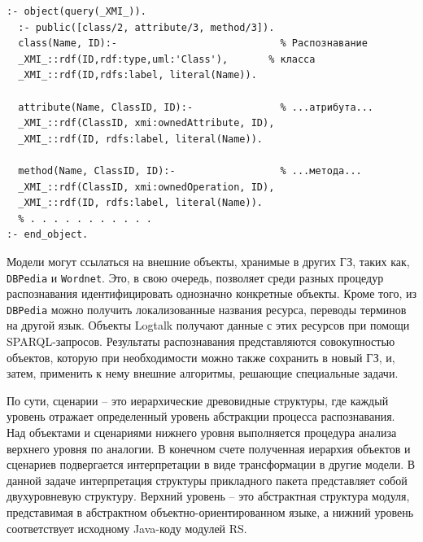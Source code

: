 \documentclass[12pt]{article}
\begin{document}
\begin{verbatim}
:- object(query(_XMI_)).
  :- public([class/2, attribute/3, method/3]).
  class(Name, ID):-                            % Распознавание
  _XMI_::rdf(ID,rdf:type,uml:'Class'),       % класса
  _XMI_::rdf(ID,rdfs:label, literal(Name)).

  attribute(Name, ClassID, ID):-               % ...атрибута...
  _XMI_::rdf(ClassID, xmi:ownedAttribute, ID),
  _XMI_::rdf(ID, rdfs:label, literal(Name)).

  method(Name, ClassID, ID):-                  % ...метода...
  _XMI_::rdf(ClassID, xmi:ownedOperation, ID),
  _XMI_::rdf(ID, rdfs:label, literal(Name)).
  % . . . . . . . . . . .
:- end_object.
\end{verbatim}

Модели могут ссылаться на внешние объекты, хранимые в других ГЗ, таких как, \texttt{DBPedia} и \texttt{Wordnet}.  Это, в свою очередь, позволяет среди разных процедур распознавания идентифицировать однозначно конкретные объекты.  Кроме того, из \texttt{DBPedia} можно получить локализованные названия ресурса, переводы терминов на другой язык.  Объекты Logtalk получают данные с этих ресурсов при помощи SPARQL-запросов.  Результаты распознавания представляются совокупностью объектов, которую при необходимости можно также сохранить в новый ГЗ, и, затем, применить к нему внешние алгоритмы, решающие специальные задачи.

По сути, сценарии -- это иерархические древовидные структуры, где каждый уровень отражает определенный уровень абстракции процесса распознавания.  Над объектами и сценариями нижнего уровня выполняется процедура анализа верхнего уровня по аналогии.  В конечном счете полученная иерархия объектов и сценариев подвергается интерпретации в виде трансформации в другие модели.  В данной задаче интерпретация структуры прикладного пакета представляет собой двухуровневую структуру. Верхний уровень -- это абстрактная структура модуля, представимая в абстрактном объектно-ориентированном языке, а нижний уровень соответствует исходному Java-коду модулей RS.
\end{document}
